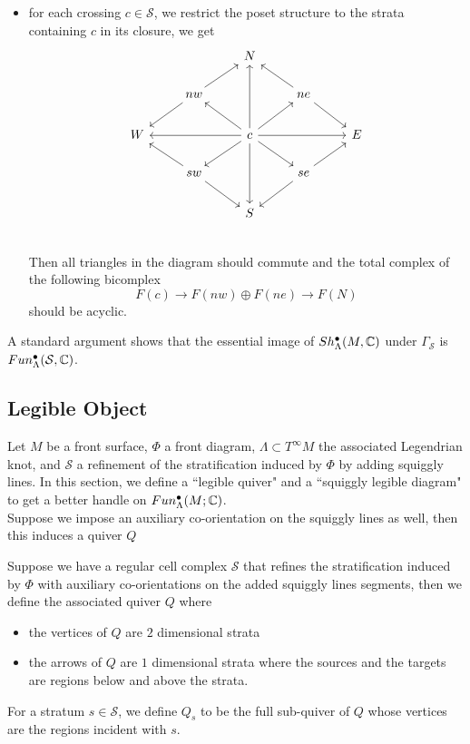 \begin{definition}
\begin{itemize}
\item for each crossing $c\in \mathcal{S}$, we restrict the poset structure to the strata containing $c$ in its closure, we get
\[
\begin{tikzcd}
& & N & &\\
& nw\arrow[ur]\arrow[dl] & & ne\arrow[ul]\arrow[dr] &  \\
W& & c\arrow[uu]\arrow[dd]\arrow[ll]\arrow[rr]\arrow[ul]\arrow[ur]\arrow[dl]\arrow[dr] & & E \\
& sw\arrow[ul]\arrow[dr] & & se\arrow[ur]\arrow[dl] &  \\
& & S & &\\
\end{tikzcd}
\]
Then all triangles in the diagram should commute and the total complex of the following bicomplex 
\[
F(c)\rightarrow F(nw)\oplus F(ne) \rightarrow F(N)
\]
should be acyclic.
\end{itemize}
\end{definition}
A standard argument shows that the essential image of  $Sh^\bullet_\Lambda(M,\mathbb{C})$ under $\Gamma_\mathcal{S}$ is $Fun^\bullet_\Lambda(\mathcal{S},\mathbb{C})$\cite{shende2017legendrian}.

\subsection*{Legible Object}
Let $M$ be a front surface, $\Phi$ a front diagram, $\Lambda \subset T^{\infty}M$ the associated Legendrian knot, and $\mathcal{S}$ a refinement of the stratification induced by $\Phi$ by adding squiggly lines. In this section, we define a ``legible quiver" and a ``squiggly legible diagram" to get a better handle on $Fun^\bullet_\Lambda(M;\mathbb{C})$.\\
Suppose we impose an auxiliary co-orientation on the squiggly lines as well, then this induces a quiver $Q$ 
\begin{definition}
Suppose we have a regular cell complex $\mathcal{S}$ that refines the stratification induced by $\Phi$ with auxiliary co-orientations on the added squiggly lines segments, then we define the associated quiver $Q$ where
\begin{itemize}
\item the vertices of $Q$ are $2$ dimensional strata
\item the arrows of $Q$ are $1$ dimensional strata where the sources and the targets are regions below and above the strata.
\end{itemize}
For a stratum $s\in \mathcal{S}$, we define $Q_s$ to be the full sub-quiver of $Q$ whose vertices are the regions incident with $s$.
\end{definition}

